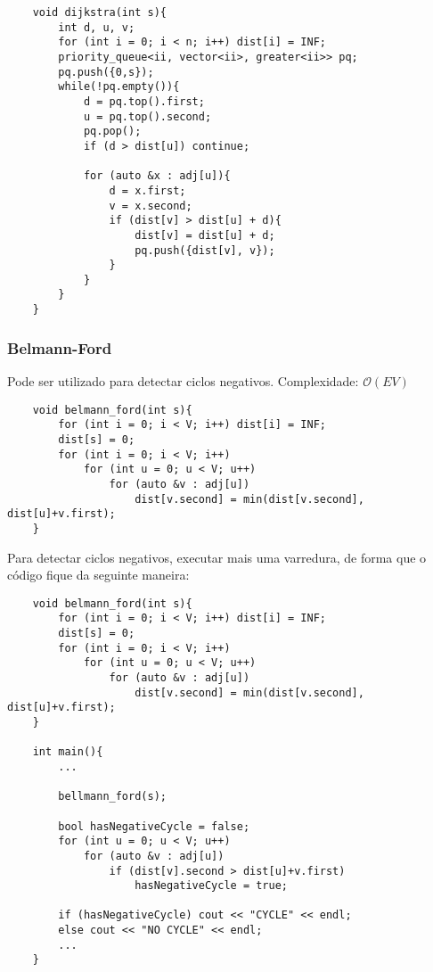 \begin{verbatim}
    void dijkstra(int s){
        int d, u, v;
        for (int i = 0; i < n; i++) dist[i] = INF;
        priority_queue<ii, vector<ii>, greater<ii>> pq;
        pq.push({0,s});
        while(!pq.empty()){
            d = pq.top().first;
            u = pq.top().second;
            pq.pop();
            if (d > dist[u]) continue;

            for (auto &x : adj[u]){
                d = x.first;
                v = x.second;
                if (dist[v] > dist[u] + d){
                    dist[v] = dist[u] + d; 
                    pq.push({dist[v], v});
                }   
            }
        }
    }

\end{verbatim}

\subsubsection{Belmann-Ford}
\par Pode ser utilizado para detectar ciclos negativos.
Complexidade: $\mathcal{O}(EV)$

\begin{verbatim}
    void belmann_ford(int s){
        for (int i = 0; i < V; i++) dist[i] = INF;
        dist[s] = 0;
        for (int i = 0; i < V; i++)
            for (int u = 0; u < V; u++)
                for (auto &v : adj[u])
                    dist[v.second] = min(dist[v.second], dist[u]+v.first);
    }
\end{verbatim}

\par Para detectar ciclos negativos, executar mais uma varredura, de forma que o código 
fique da seguinte maneira:

\begin{verbatim}
    void belmann_ford(int s){
        for (int i = 0; i < V; i++) dist[i] = INF;
        dist[s] = 0;
        for (int i = 0; i < V; i++)
            for (int u = 0; u < V; u++)
                for (auto &v : adj[u])
                    dist[v.second] = min(dist[v.second], dist[u]+v.first);
    }

    int main(){
        ...

        bellmann_ford(s);

        bool hasNegativeCycle = false;
        for (int u = 0; u < V; u++)
            for (auto &v : adj[u])
                if (dist[v].second > dist[u]+v.first)
                    hasNegativeCycle = true;

        if (hasNegativeCycle) cout << "CYCLE" << endl;
        else cout << "NO CYCLE" << endl;
        ...
    }
\end{verbatim}


